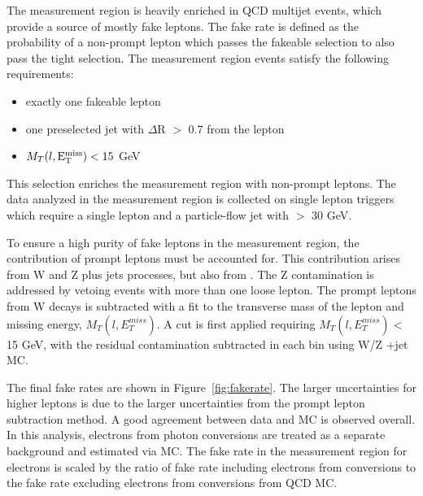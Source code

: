 The measurement region is heavily enriched in QCD multijet events, which provide a
source of mostly fake leptons. The fake rate is defined as the probability of a non-prompt lepton which passes the fakeable selection to also pass the tight selection.
The measurement region events satisfy the following requirements:

\begin{itemize}
 \item exactly one fakeable lepton
 \item one preselected jet with $\Delta$R $>$ 0.7 from the lepton
 \item $M_{T}(l,\mathrm{E}^{\mathrm{miss}}_{\mathrm{T}}) < 15$ GeV
\end{itemize}

\noindent This selection enriches the measurement region with non-prompt leptons. The data analyzed in the measurement region is collected on single lepton
triggers which require a single lepton and a particle-flow jet with \pt $>$ 30 GeV.

To ensure a high purity of fake leptons in the measurement region, the contribution of prompt leptons must be accounted for. This contribution arises from W and Z plus jets processes, but also from \ttbar. The Z contamination
is addressed by vetoing events with more than one loose lepton. The prompt leptons from W decays is subtracted with a fit to the transverse mass of the lepton and missing energy, $M_{T}(l,E_{T}^{miss})$. A cut is first applied requiring
$M_{T}(l,E_{T}^{miss}) < $15 GeV, with the residual contamination subtracted in each \pt bin using W/Z +jet MC. 

The final fake rates are shown in Figure~\ref{fig:fakerate}. The larger uncertainties for higher \pt leptons is due to the larger uncertainties from the prompt lepton subtraction method. A good agreement between data and MC is observed overall.
In this analysis, electrons from photon conversions are treated as a separate background and estimated via MC. The fake rate in the measurement region for electrons is scaled by the ratio of fake rate including electrons from conversions to
the fake rate excluding electrons from conversions from QCD MC. 

